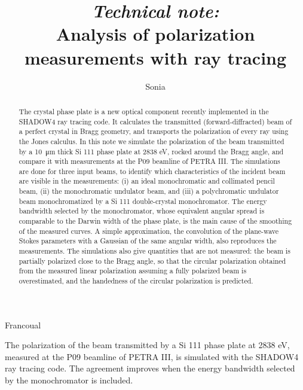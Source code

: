 \documentclass{iucr}
\newcommand{\todo}[1]{{\color{red}[TODO: "#1'']}}
\begin{document}

\title{{\it Technical note:}\\ \vspace{4mm}  Analysis of polarization measurements with ray tracing}

\author[1]{{Sonia}}{{Francoual}}


\maketitle                        %

\begin{synopsis}
The polarization of the beam transmitted by a Si 111 phase plate at 2838 eV, measured at the P09 beamline of PETRA III, is simulated with the SHADOW4 ray tracing code. The agreement improves when the energy bandwidth selected by the monochromator is included.
\end{synopsis}

\begin{abstract}
	The crystal phase plate is a new optical component recently implemented in the SHADOW4 ray tracing code. It calculates the transmitted (forward-diffracted) beam of a perfect crystal in Bragg geometry, and transports the polarization of every ray using the Jones calculus. In this note we simulate the polarization of the beam transmitted by a \SI{10}{\micro\meter} thick Si 111 phase plate at 2838 eV, rocked around the Bragg angle, and compare it with measurements at the P09 beamline of PETRA III. The simulations are done for three input beams, to identify which characteristics of the incident beam are visible in the measurements: (i) an ideal monochromatic and collimated pencil beam, (ii) the monochromatic undulator beam, and (iii) a polychromatic undulator beam monochromatized by a Si 111 double-crystal monochromator. The energy bandwidth selected by the monochromator, whose equivalent angular spread is comparable to the Darwin width of the phase plate, is the main cause of the smoothing of the measured curves. A simple approximation, the convolution of the plane-wave Stokes parameters with a Gaussian of the same angular width, also reproduces the measurements. The simulations also give quantities that are not measured: the beam is partially polarized close to the Bragg angle, so that the circular polarization obtained from the measured linear polarization assuming a fully polarized beam is overestimated, and the handedness of the circular polarization is predicted.
\end{abstract}
\end{document}
